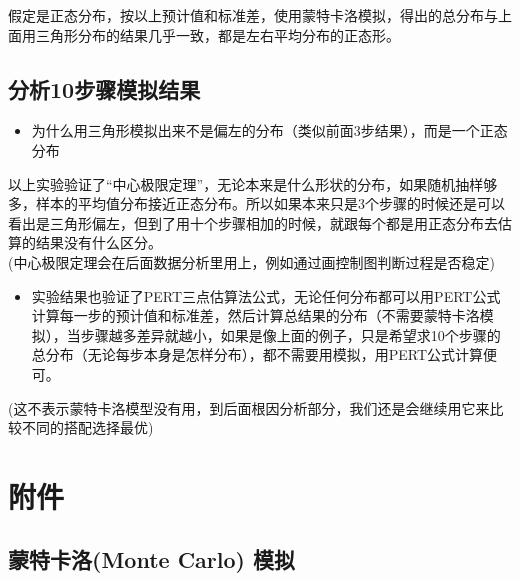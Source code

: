 假定是正态分布，按以上预计值和标准差，使用蒙特卡洛模拟，得出的总分布与上面用三角形分布的结果几乎一致，都是左右平均分布的正态形。

\hypertarget{ux5206ux679010ux6b65ux9aa4ux6a21ux62dfux7ed3ux679c}{%
\subsection{分析10步骤模拟结果}\label{ux5206ux679010ux6b65ux9aa4ux6a21ux62dfux7ed3ux679c}}

\begin{itemize}
\tightlist
\item
  为什么用三角形模拟出来不是偏左的分布（类似前面3步结果），而是一个正态分布
\end{itemize}

\begin{description}
\tightlist
\item[]
以上实验验证了``中心极限定理''，无论本来是什么形状的分布，如果随机抽样够多，样本的平均值分布接近正态分布。所以如果本来只是3个步骤的时候还是可以看出是三角形偏左，但到了用十个步骤相加的时候，就跟每个都是用正态分布去估算的结果没有什么区分。\\

(中心极限定理会在后面数据分析里用上，例如通过画控制图判断过程是否稳定)\\
\end{description}

\begin{itemize}
\tightlist
\item
  实验结果也验证了PERT三点估算法公式，无论任何分布都可以用PERT公式计算每一步的预计值和标准差，然后计算总结果的分布（不需要蒙特卡洛模拟），当步骤越多差异就越小，如果是像上面的例子，只是希望求10个步骤的总分布（无论每步本身是怎样分布），都不需要用模拟，用PERT公式计算便可。\\
\end{itemize}

\begin{description}
\tightlist
\item[]
(这不表示蒙特卡洛模型没有用，到后面根因分析部分，我们还是会继续用它来比较不同的搭配选择最优)
\end{description}

\hypertarget{ux9644ux4ef6}{%
\section{附件}\label{ux9644ux4ef6}}

\hypertarget{ux8499ux7279ux5361ux6d1bmonte-carlo-ux6a21ux62df}{%
\subsection{蒙特卡洛(Monte Carlo)
模拟}\label{ux8499ux7279ux5361ux6d1bmonte-carlo-ux6a21ux62df}}

